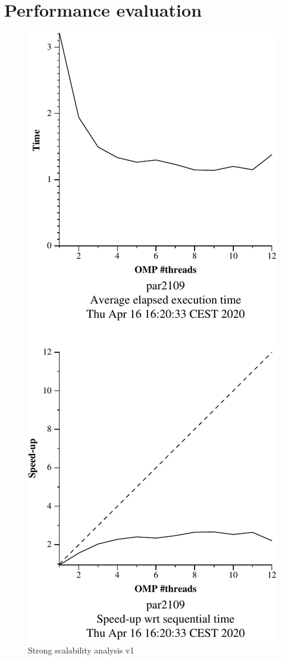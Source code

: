 \section{Performance evaluation}%
\label{sec:Performance evaluation}



\begin{figure}[H]
    \begin{minipage}{0.5\textwidth}
        \centering
        \includegraphics[width=0.7\linewidth]{plots/v1-crop.pdf}
        \caption{Strong scalability analysis v1}

\end{minipage}
\end{figure}

